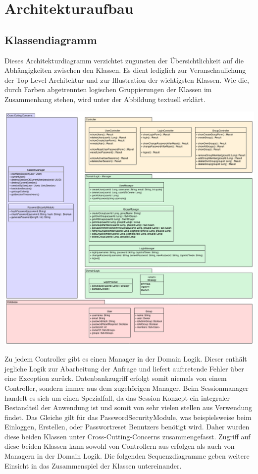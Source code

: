 \documentclass[12pt,DIV14,BCOR10mm,a4paper,parskip=half-,headsepline,headinclude,english,ngerman,bibliography=totocnumbered]{scrreprt}
\begin{document}
\tableofcontents  %

\chapter{Architekturaufbau}
\section{Klassendiagramm}
Dieses Architekturdiagramm verzichtet zugunsten der Übersichtlichkeit auf die Abhängigkeiten zwischen den Klassen. Es dient lediglich zur Veranschaulichung der Top-Level-Architektur und zur Illustration der wichtigsten Klassen. Wie die, durch Farben abgetrennten logischen Gruppierungen der Klassen im Zusammenhang stehen, wird unter der Abbildung textuell erklärt.

\includegraphics[width=0.73\paperwidth]{resources/class_diagram.png}
\label{architecture:class_diagram}

Zu jedem Controller gibt es einen Manager in der Domain Logik. Dieser enthält jegliche Logik zur Abarbeitung der Anfrage und liefert auftretende Fehler über eine Exception zurück. Datenbankzugriff erfolgt somit niemals von einem Controller, sondern immer aus dem zugehörigen Manager. Beim Sessionmanager handelt es sich um einen Spezialfall, da das Session Konzept ein integraler Bestandteil der Anwendung ist und somit von sehr vielen stellen aus Verwendung findet. Das Gleiche gilt für das PasswordSecurityModule, was beispielsweise beim Einloggen, Erstellen, oder Passwortreset Benutzers benötigt wird. Daher wurden diese beiden Klassen unter Cross-Cutting-Concerns zusammengefasst. Zugriff auf diese beiden Klassen kann sowohl von Controllern aus erfolgen als auch von Managern in der Domain Logik. Die folgenden Sequenzdiagramme geben weitere Einsicht in das Zusammenspiel der Klassen untereinander.
\end{document}
